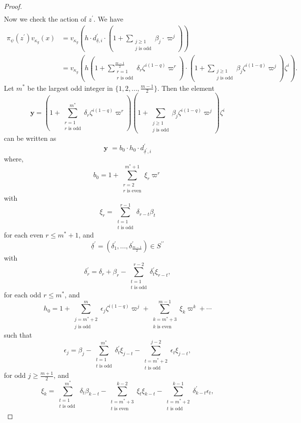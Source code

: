\documentclass[12pt]{amsart}
\theoremstyle{definition}
\theoremstyle{remark}
\begin{document}
\begin{proof}
\begin{align*}
\end{align*}
Now we check the action of $z^\prime$. We have 
\begin{align*}
\pi_\psi(z^\prime) v_{\kappa_g}(x) &= v_{\kappa_g}(h \cdot d_{\underline{\delta}, i}^\prime \cdot (1 + \sum\limits_{\substack{j \geq 1  \\    j \text{ is odd} }}\beta_j \cdot \varpi^j )) \\
&= v_{\kappa_g}\left( h (1 + \sum\limits_{\substack{ r = 1  \\  r \text{ is odd} }}^{\frac{m-1}{2}} \delta_r \zeta^{i(1-q)} \varpi^r)  \cdot (1 + \sum\limits_{\substack{j \geq 1  \\    j \text{ is odd} }}\beta_j  \zeta^{i(1-q)} \varpi^j ) \zeta^i \right).
\end{align*}
Let $m^*$ be the largest odd integer in $\{1,2,...,\frac{m-1}{2}\}$. Then the element 
\[\textbf{y} = (1 + \sum\limits_{\substack{r = 1  \\    r \text{ is odd} }}^{m^*} \delta_r \zeta^{i(1-q)} \varpi^r) (1 + \sum\limits_{\substack{j \geq 1  \\    j \text{ is odd} }}\beta_j  \zeta^{i(1-q)} \varpi^j ) \zeta^i\]
can be written as 
\[\textbf{y } = b_0 \cdot h_0 \cdot d^\prime_{\underline{\delta}^{\prime},i}\] 
where,
\[b_0 = 1 + \sum\limits_{\substack{r = 2 \\    r \text{ is even} }}^{m^*+1} \xi_r  \varpi^r \]
with 
\[\xi_r = \sum\limits_{\substack{t=1  \\    t \text{ is odd} }}^{r-1} \delta_{r-t}\beta_t \]
for each even $r \leq m^*+1$, 
and
\[\underline{\delta}^{\prime} = (\delta_1^{\prime},...,\delta_{\frac{m-1}{2}}^{\prime}) \in S^{\prime\prime}\]
with 
\[\delta_r^{\prime} = \delta_r + \beta_r  - \sum\limits_{\substack{t =1 \\    t \text{ is odd} }}^{r-2} \delta_t^{\prime} \xi_{r-t},\]
for each odd $r \leq m^*$, 
and
\[h_0 = 1 + \sum\limits_{\substack{j =m^*+2  \\    j \text{ is odd} }}^{m} \epsilon_j \zeta^{i(1-q)}\varpi^j + \sum\limits_{\substack{k =m^* +3 \\    k \text{ is even} }}^{m-1} \xi_k \varpi^k +  \cdots \]
such that
\[\epsilon_j = \beta_j -\sum\limits_{\substack{t=1  \\    t \text{ is odd} }}^{m^*} \delta_t^\prime \xi_{j-t}- \sum\limits_{\substack{t=m^* +2  \\    t \text{ is odd} }}^{j-2} \epsilon_t \xi_{j-t}, \]
for odd $j \geq \frac{m+1}{2}$,
and
\[\xi_k = \sum\limits_{\substack{t=1  \\    t \text{ is odd } }}^{m^*}\delta_t \beta_{k-t} -\sum\limits_{\substack{t=m^*+3  \\    t \text{ is even} }}^{k-2} \xi_t \xi_{k-t} - \sum\limits_{\substack{t=m^*+2  \\    t \text{ is odd} }}^{k-1} \delta_{k-t}^\prime \epsilon_{t},\]

\end{proof}
\end{document}
